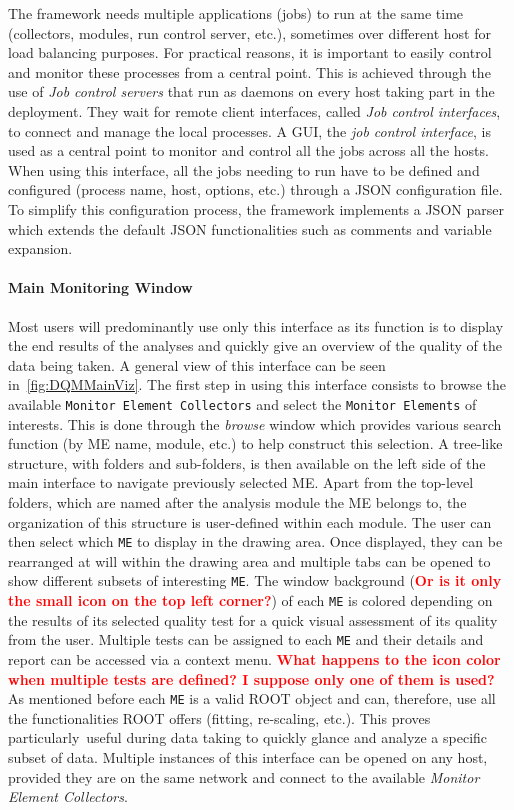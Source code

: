 \documentclass{webofc}
\begin{document}
The framework needs multiple applications (jobs) to run at the same time (collectors, modules, run control server, etc.), sometimes over different host for load balancing purposes.
For practical reasons, it is important to easily control and monitor these processes from a central point.
This is achieved through the use of \textit{Job control servers} that run as daemons on every host taking part in the deployment.
They wait for remote client interfaces, called \textit{Job control interfaces}, to connect and manage the local processes.
A GUI, the \textit{job control interface}, is used as a central point to monitor and control all the jobs across all the hosts.
When using this interface, all the jobs needing to run have to be defined and configured (process name, host, options, etc.) through a JSON configuration file.
To simplify this configuration process, the framework implements a JSON parser which extends the default JSON functionalities such as comments and variable expansion.

\paragraph{Main Monitoring Window}\label{par:MainGUI}

Most users will predominantly use only this interface as its function is to display the end results of the analyses and quickly give an overview of the quality of the data being taken.
A general view of this interface can be seen in~\autoref{fig:DQMMainViz}.
The first step in using this interface consists to browse the available \texttt{Monitor Element Collectors} and select the \texttt{Monitor Elements} of interests.
This is done through the \textit{browse} window which provides various search function (by ME name, module, etc.) to help construct this selection.
A tree-like structure, with folders and sub-folders, is then available on the left side of the main interface to navigate previously selected ME.
Apart from the top-level folders, which are named after the analysis module the ME belongs to, the organization of this structure is user-defined within each module. 
The user can then select which \texttt{ME} to display in the drawing area.
Once displayed, they can be rearranged at will within the drawing area and multiple tabs can be opened to show different subsets of interesting \texttt{ME}.
The window background (\textcolor{red}{\textbf{Or is it only the small icon on the top left corner?}}) of each \texttt{ME} is colored depending on the results of its selected quality test for a quick visual assessment of its quality from the user.
Multiple tests can be assigned to each \texttt{ME} and their details and report can be accessed via a context menu. \textcolor{red}{\textbf{What happens to the icon color when multiple tests are defined? I suppose only one of them is used?}}
As mentioned before each \texttt{ME} is a valid ROOT object and can, therefore, use all the functionalities ROOT offers (fitting, re-scaling, etc.).
This proves particularly useful during data taking to quickly glance and analyze a specific subset of data. 
Multiple instances of this interface can be opened on any host, provided they are on the same network and connect to the available \textit{Monitor Element Collectors}. 
\end{document}
